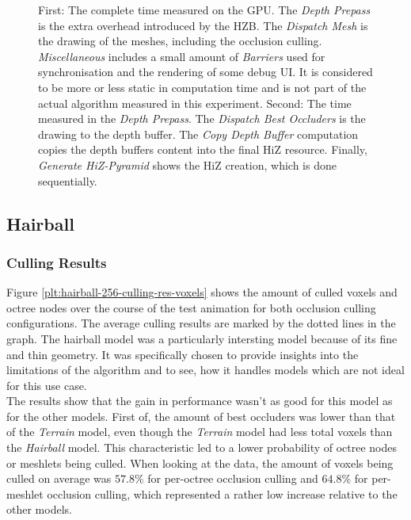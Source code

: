 \begin{figure}[!htb]
  \caption{First: The complete time measured on the \ac{GPU}. The \emph{Depth Prepass} is the extra overhead 
  introduced by the \ac{HZB}. The \emph{Dispatch Mesh} is the drawing of the meshes, including the occlusion 
  culling. \emph{Miscellaneous} includes a small amount of \emph{Barriers} used for synchronisation and the 
  rendering of some debug \ac{UI}. It is considered to be more or less static in computation time and is not 
  part of the actual algorithm measured in this experiment. Second: The time measured in the \emph{Depth Prepass}. 
  The \emph{Dispatch Best Occluders} is the drawing to the depth buffer. The \emph{Copy Depth Buffer} computation 
  copies the depth buffers content into the final \ac{HiZ} resource. Finally, \emph{Generate HiZ-Pyramid} shows 
  the \ac{HiZ} creation, which is done sequentially.}
  \label{fig:terrain-gpu-times}
\end{figure}


\clearpage




\subsection*{Hairball}

\subsubsection*{Culling Results} \label{subsubsec-culling-results-hairball}

Figure \ref{plt:hairball-256-culling-res-voxels} shows the amount of culled voxels and octree nodes 
over the course of the test animation for both occlusion culling configurations. The average culling 
results are marked by the dotted lines in the graph. The hairball model was a particularly intersting 
model because of its fine and thin geometry. It was specifically chosen to provide insights into the 
limitations of the algorithm and to see, how it handles models which are not ideal for this use case.\\

\noindent
The results show that the gain in performance wasn't as good for this model as for the other models.
First of, the amount of best occluders was lower than that of the \emph{Terrain} model, even though the 
\emph{Terrain} model had less total voxels than the \emph{Hairball} model. This characteristic led to 
a lower probability of octree nodes or meshlets being culled. When looking at the data, the amount of 
voxels being culled on average was $57.8\%$ for per-octree occlusion culling and $64.8\%$ for per-meshlet 
occlusion culling, which represented a rather low increase relative to the other models. 

